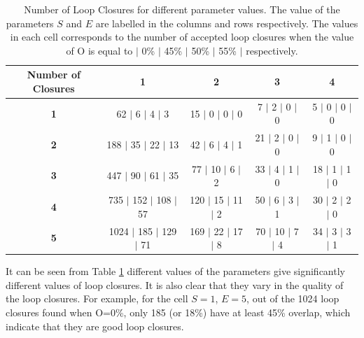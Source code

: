 \documentclass[11pt]{article}
\begin{document}
\begin{table}[h!]
	\vspace*{1cm}
	\centering
	\begin{tabular}{||c || c | c | c | c  ||} 
		\hline
		\textbf{Number of Closures} & \textbf{1} & \textbf{2} & \textbf{3} & \textbf{4}\\ [0.5ex] 
		\hline\hline
		\textbf{1} & \hphantom{00}62 $\vert$ \hphantom{00}6 $\vert$ \hphantom{00}4 $\vert$ \hphantom{0}3 & \hphantom{0}15 $\vert$ \hphantom{0}0 $\vert$ \hphantom{0}0 $\vert$ 0  & \hphantom{0}7 $\vert$ \hphantom{0}2 $\vert$ 0 $\vert$ 0 & \hphantom{0}5 $\vert$ 0 $\vert$ 0 $\vert$ 0 \\ 
		\textbf{2} & \hphantom{0}188 $\vert$ \hphantom{0}35 $\vert$ \hphantom{0}22 $\vert$ 13 & \hphantom{0}42 $\vert$ \hphantom{0}6 $\vert$ \hphantom{0}4 $\vert$ 1 & 21 $\vert$ \hphantom{0}2 $\vert$ 0 $\vert$ 0 & \hphantom{0}9 $\vert$ 1 $\vert$ 0 $\vert$ 0 \\
		\textbf{3} & \hphantom{0}447 $\vert$ \hphantom{0}90 $\vert$ \hphantom{0}61 $\vert$ 35 & \hphantom{0}77 $\vert$ 10 $\vert$ \hphantom{0}6 $\vert$ 2 & 33 $\vert$ \hphantom{0}4 $\vert$ 1 $\vert$ 0 & 18 $\vert$ 1 $\vert$ 1 $\vert$ 0 \\
		\textbf{4} & \hphantom{0}735 $\vert$ 152 $\vert$ 108 $\vert$ 57 & 120 $\vert$ 15 $\vert$ 11 $\vert$ 2 & 50 $\vert$ \hphantom{0}6 $\vert$ 3 $\vert$ 1 & 30 $\vert$ 2 $\vert$ 2 $\vert$ 0 \\
		\textbf{5} & 1024 $\vert$ 185 $\vert$ 129 $\vert$ 71 &  169 $\vert$ 22 $\vert$ 17 $\vert$ 8 & 70 $\vert$ 10 $\vert$ 7 $\vert$ 4 & 34 $\vert$ 3 $\vert$ 3 $\vert$ 1 \\ [1ex] 
		\hline
	\end{tabular}
	\caption{Number of Loop Closures for different parameter values. The value of the parameters $S$ and $E$ are labelled in the columns and rows respectively. The values in each cell corresponds to the number of accepted loop closures when the value of O is equal to $\vert$ 0\% $\vert$ 45\% $\vert$ 50\% $\vert$ 55\% $\vert$ respectively. }
	\label{table:LoopClosure}
\end{table}
	
It can be seen from Table \ref{table:LoopClosure} different values of the parameters give significantly different values of loop closures. It is also clear that they vary in the quality of the loop closures. For example, for the cell $S=1$, $E=5$, out of the 1024 loop closures found when O=0\%, only 185 (or 18\%) have at least 45\% overlap, which indicate that they are good loop closures.
\end{document}
